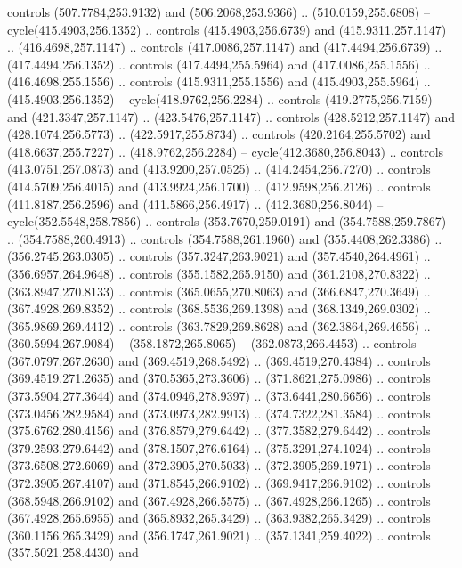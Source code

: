 \begin{scope}[cm={{1.25,0.0,0.0,-1.25,(0.0,743.43331)}}]
    controls (507.7784,253.9132) and (506.2068,253.9366) .. (510.0159,255.6808) --
    cycle(415.4903,256.1352) .. controls (415.4903,256.6739) and
    (415.9311,257.1147) .. (416.4698,257.1147) .. controls (417.0086,257.1147) and
    (417.4494,256.6739) .. (417.4494,256.1352) .. controls (417.4494,255.5964) and
    (417.0086,255.1556) .. (416.4698,255.1556) .. controls (415.9311,255.1556) and
    (415.4903,255.5964) .. (415.4903,256.1352) -- cycle(418.9762,256.2284) ..
    controls (419.2775,256.7159) and (421.3347,257.1147) .. (423.5476,257.1147) ..
    controls (428.5212,257.1147) and (428.1074,256.5773) .. (422.5917,255.8734) ..
    controls (420.2164,255.5702) and (418.6637,255.7227) .. (418.9762,256.2284) --
    cycle(412.3680,256.8043) .. controls (413.0751,257.0873) and
    (413.9200,257.0525) .. (414.2454,256.7270) .. controls (414.5709,256.4015) and
    (413.9924,256.1700) .. (412.9598,256.2126) .. controls (411.8187,256.2596) and
    (411.5866,256.4917) .. (412.3680,256.8044) -- cycle(352.5548,258.7856) ..
    controls (353.7670,259.0191) and (354.7588,259.7867) .. (354.7588,260.4913) ..
    controls (354.7588,261.1960) and (355.4408,262.3386) .. (356.2745,263.0305) ..
    controls (357.3247,263.9021) and (357.4540,264.4961) .. (356.6957,264.9648) ..
    controls (355.1582,265.9150) and (361.2108,270.8322) .. (363.8947,270.8133) ..
    controls (365.0655,270.8063) and (366.6847,270.3649) .. (367.4928,269.8352) ..
    controls (368.5536,269.1398) and (368.1349,269.0302) .. (365.9869,269.4412) ..
    controls (363.7829,269.8628) and (362.3864,269.4656) .. (360.5994,267.9084) --
    (358.1872,265.8065) -- (362.0873,266.4453) .. controls (367.0797,267.2630) and
    (369.4519,268.5492) .. (369.4519,270.4384) .. controls (369.4519,271.2635) and
    (370.5365,273.3606) .. (371.8621,275.0986) .. controls (373.5904,277.3644) and
    (374.0946,278.9397) .. (373.6441,280.6656) .. controls (373.0456,282.9584) and
    (373.0973,282.9913) .. (374.7322,281.3584) .. controls (375.6762,280.4156) and
    (376.8579,279.6442) .. (377.3582,279.6442) .. controls (379.2593,279.6442) and
    (378.1507,276.6164) .. (375.3291,274.1024) .. controls (373.6508,272.6069) and
    (372.3905,270.5033) .. (372.3905,269.1971) .. controls (372.3905,267.4107) and
    (371.8545,266.9102) .. (369.9417,266.9102) .. controls (368.5948,266.9102) and
    (367.4928,266.5575) .. (367.4928,266.1265) .. controls (367.4928,265.6955) and
    (365.8932,265.3429) .. (363.9382,265.3429) .. controls (360.1156,265.3429) and
    (356.1747,261.9021) .. (357.1341,259.4022) .. controls (357.5021,258.4430) and

\end{scope}
